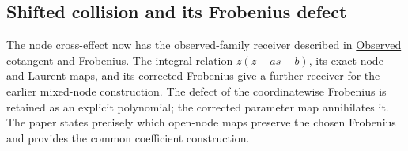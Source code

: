 \documentclass[
]{article}
\begin{document}
\subsection{Shifted collision and its Frobenius
defect}\label{shifted-collision-and-its-frobenius-defect}

The node cross-effect now has the observed-family receiver described in
\href{https://github.com/KokunoYumeto/zeta-function-research-reader/blob/c9df443d9e1df000dfbb083943f97197e746eb08/workbenches/splitzero-tandem/branches/identity-absorber-square/OBSERVED_COTANGENT_FROBENIUS.md}{Observed
cotangent and Frobenius}. The integral relation \(z(z-as-b)\), its exact
node and Laurent maps, and its corrected Frobenius give a further
receiver for the earlier mixed-node construction. The defect of the
coordinatewise Frobenius is retained as an explicit polynomial; the
corrected parameter map annihilates it. The paper states precisely which
open-node maps preserve the chosen Frobenius and provides the common
coefficient construction.
\end{document}
